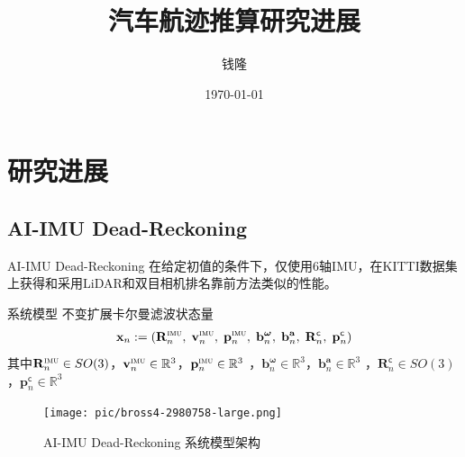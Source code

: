 \documentclass{beamer} %
\title{汽车航迹推算研究进展}
\author{钱隆}
\institute{武汉大学测绘遥感信息工程国家重点实验室}
\date{\today}
\begin{document}
\kaishu

\begin{frame} %
    \titlepage
\end{frame}

\begin{frame}
    \tableofcontents[sectionstyle=show,subsectionstyle=show/shaded/hide,subsubsectionstyle=show/shaded/hide]
\end{frame}


\section{研究进展}

\subsection{AI-IMU Dead-Reckoning}

\begin{frame}
    AI-IMU Dead-Reckoning  在给定初值的条件下，仅使用6轴IMU，在KITTI数据集上获得和采用LiDAR和双目相机排名靠前方法类似的性能。
\end{frame}

\begin{frame}{系统模型}
    不变扩展卡尔曼滤波状态量
    \begin{align*} \mathbf {x}_n:=\left(\mathbf {R}_n^{\textsc {imu}},\;\mathbf {v}_n^{\textsc {imu}},\;\mathbf {p}_n^{\textsc {imu}},\;\mathbf {b}_{n}^{\boldsymbol{\omega }}, \;\mathbf {b}_{n}^{\mathbf {a}},\; \mathbf {R}_n^{\mathsf {c}}, \;\mathbf {p}_n^{\mathsf {c}}\right) \end{align*}
    其中$ \mathbf {R}_n^{\textsc {imu}}\in SO(3) $，$ \mathbf {v}_n^{\textsc {imu}}\in \mathbb{R}^3 $，$ \mathbf {p}_n^{\textsc {imu}}\in \mathbb{R}^3 $
    ，$ \mathbf {b}_{n}^{\boldsymbol{\omega }} \in \mathbb{R}^3 $，$ \mathbf {b}_{n}^{\mathbf {a}} \in \mathbb{R}^3 $
    ，$ \mathbf {R}_n^{\mathsf {c}} \in SO(3) $，$ \mathbf {p}_n^{\mathsf {c}} \in \mathbb{R}^3 $
    \begin{figure}[htbp]
        \centering
        \texttt{[image: pic/bross4-2980758-large.png]}
        \caption{AI-IMU Dead-Reckoning 系统模型架构}
        \label{fig:transformer-arc}
    \end{figure}
\end{frame}
\end{document}
